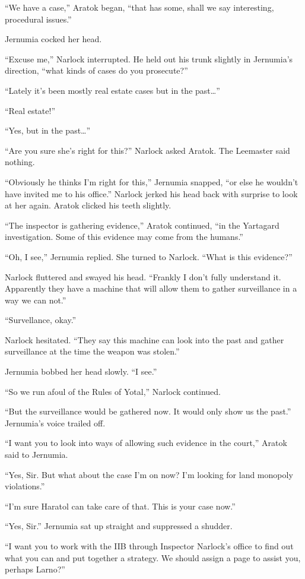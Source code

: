 ``We have a case,'' Aratok began, ``that has some, shall we say interesting, procedural
issues.''

Jernumia cocked her head.

``Excuse me,'' Narlock interrupted. He held out his trunk slightly in Jernumia's direction,
``what kinds of cases do you prosecute?''

``Lately it's been mostly real estate cases but in the past\ldots''

``Real estate!''

``Yes, but in the past\ldots''

``Are you sure she's right for this?'' Narlock asked Aratok. The Leemaster said nothing.

``Obviously he thinks I'm right for this,'' Jernumia snapped, ``or else he wouldn't have invited
me to his office.'' Narlock jerked his head back with surprise to look at her again. Aratok
clicked his teeth slightly.

``The inspector is gathering evidence,'' Aratok continued, ``in the Yartagard investigation.
Some of this evidence may come from the humans.''

``Oh, I see,'' Jernumia replied. She turned to Narlock. ``What is this evidence?''

Narlock fluttered and swayed his head. ``Frankly I don't fully understand it. Apparently they
have a machine that will allow them to gather surveillance in a way we can not.''

``Survellance, okay.''

Narlock hesitated. ``They say this machine can look into the past and gather surveillance at the
time the weapon was stolen.''

Jernumia bobbed her head slowly. ``I see.''

``So we run afoul of the Rules of Yotal,'' Narlock continued.

``But the surveillance would be gathered now. It would only show us the past.'' Jernumia's voice
trailed off.

``I want you to look into ways of allowing such evidence in the court,'' Aratok said to
Jernumia.

``Yes, Sir. But what about the case I'm on now? I'm looking for land monopoly violations.''

``I'm sure Haratol can take care of that. This is your case now.''

``Yes, Sir.'' Jernumia sat up straight and suppressed a shudder.

``I want you to work with the IIB through Inspector Narlock's office to find out what you can
and put together a strategy. We should assign a page to assist you, perhaps Larno?''

